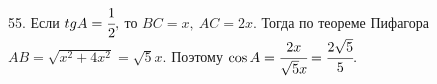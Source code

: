 55. Если $tg A=\cfrac{1}{2},$ то $BC=x,\ AC=2x.$ Тогда по теореме Пифагора $AB=\sqrt{x^2+4x^2}=\sqrt{5}x.$ Поэтому $\cos A=\cfrac{2x}{\sqrt{5}x}=\cfrac{2\sqrt{5}}{5}.$\\
